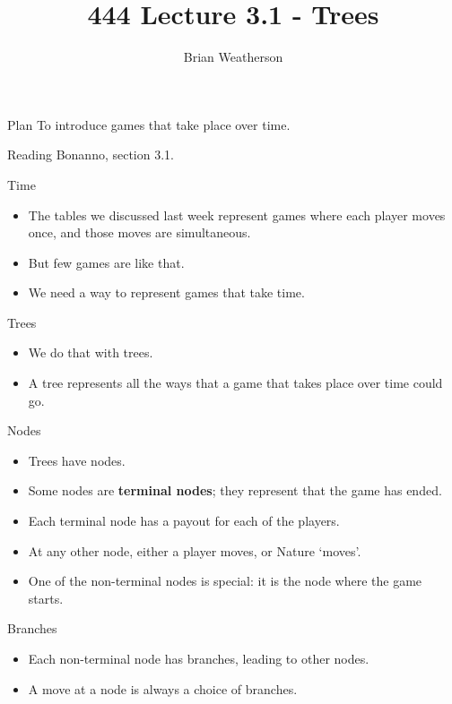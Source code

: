 \documentclass[
  ignorenonframetext,
]{beamer}
\title{444 Lecture 3.1 - Trees}
\author{Brian Weatherson}
\date{}
\providecommand{\tightlist}{%
  \setlength{\itemsep}{0pt}\setlength{\parskip}{0pt}}
\begin{document}
\frame{\titlepage}

\begin{frame}{Plan}
\protect\hypertarget{plan}{}
To introduce games that take place over time.
\end{frame}

\begin{frame}{Reading}
\protect\hypertarget{reading}{}
Bonanno, section 3.1.
\end{frame}

\begin{frame}{Time}
\protect\hypertarget{time}{}
\begin{itemize}
\tightlist
\item
  The tables we discussed last week represent games where each player
  moves once, and those moves are simultaneous.
\item
  But few games are like that.
\item
  We need a way to represent games that take time.
\end{itemize}
\end{frame}

\begin{frame}{Trees}
\protect\hypertarget{trees}{}
\begin{itemize}
\tightlist
\item
  We do that with trees.
\item
  A tree represents all the ways that a game that takes place over time
  could go.
\end{itemize}
\end{frame}

\begin{frame}{Nodes}
\protect\hypertarget{nodes}{}
\begin{itemize}[<+->]
\tightlist
\item
  Trees have nodes.
\item
  Some nodes are \textbf{terminal nodes}; they represent that the game
  has ended.
\item
  Each terminal node has a payout for each of the players.
\item
  At any other node, either a player moves, or Nature `moves'.
\item
  One of the non-terminal nodes is special: it is the node where the
  game starts.
\end{itemize}
\end{frame}

\begin{frame}{Branches}
\protect\hypertarget{branches}{}
\begin{itemize}
\tightlist
\item
  Each non-terminal node has branches, leading to other nodes.
\item
  A move at a node is always a choice of branches.
\end{itemize}
\end{frame}
\end{document}
